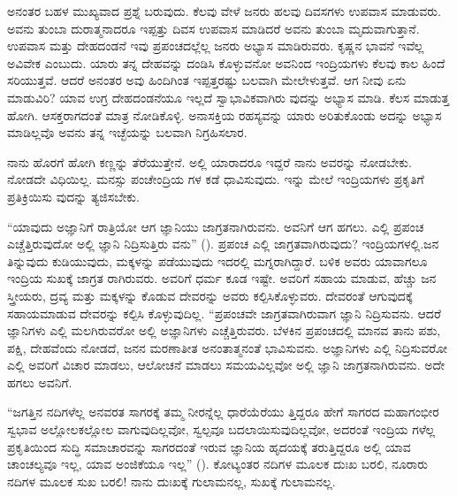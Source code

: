 ಅನಂತರ ಬಹಳ ಮುಖ್ಯವಾದ ಪ್ರಶ್ನೆ ಬರುವುದು. ಕೆಲವು ವೇಳೆ ಜನರು ಹಲವು ದಿವಸಗಳು ಉಪವಾಸ ಮಾಡುವರು. ಅವನು ತುಂಬಾ ದುರಾತ್ಮನಾದರೂ ಇಪ್ಪತ್ತು ದಿವಸ ಉಪವಾಸ ಮಾಡಿದರೆ ಅವನು ತುಂಬಾ ಮೃದುವಾಗುತ್ತಾನೆ. ಉಪವಾಸ ಮತ್ತು ದೇಹದಂಡನೆ ಇವು ಪ್ರಪಂಚದಲ್ಲೆಲ್ಲ ಜನರು ಅಭ್ಯಾಸ ಮಾಡಿರುವರು. ಕೃಷ್ಣನ ಭಾವನೆ ಇವೆಲ್ಲ ಅವಿವೇಕ ಎಂಬುದು. ಯಾರು ತನ್ನ ದೇಹವನ್ನು ದಂಡಿಸಿ ಕೊಳ್ಳುವನೋ ಅವನಿಂದ ಇಂದ್ರಿಯಗಳು ಕೆಲವು ಕಾಲ ಹಿಂದೆ ಸರಿಯುತ್ತವೆ. ಆದರೆ ಅನಂತರ ಅವು ಹಿಂದಿಗಿಂತ ಇಪ್ಪತ್ತರಷ್ಟು ಬಲವಾಗಿ ಮೇಲೇಳುತ್ತವೆ. ಆಗ ನೀವು ಏನು ಮಾಡುವಿರಿ? ಯಾವ ಉಗ್ರ ದೇಹದಂಡನೆಯೂ ಇಲ್ಲದೆ ಸ್ವಾಭಾವಿಕವಾಗಿರು ವುದನ್ನು ಅಭ್ಯಾಸ ಮಾಡಿ. ಕೆಲಸ ಮಾಡುತ್ತ ಹೋಗಿ. ಆಸಕ್ತರಾಗದಂತೆ ಮಾತ್ರ ನೋಡಿಕೊಳ್ಳಿ. ಅನಾಸಕ್ತಿಯ ರಹಸ್ಯವನ್ನು ಯಾರು ಅರಿತುಕೊಂಡು ಅದನ್ನು ಅಭ್ಯಾಸ ಮಾಡಿಲ್ಲವೊ ಅವನು ತನ್ನ ಇಚ್ಛೆಯನ್ನು ಬಲವಾಗಿ ನಿಗ್ರಹಿಸಲಾರ.

ನಾನು ಹೊರಗೆ ಹೋಗಿ ಕಣ್ಣನ್ನು ತೆರೆಯುತ್ತೇನೆ. ಅಲ್ಲಿ ಯಾರಾದರೂ ಇದ್ದರೆ ನಾನು ಅವರನ್ನು ನೋಡಬೇಕು. ನೋಡದೇ ವಿಧಿಯಿಲ್ಲ. ಮನಸ್ಸು ಪಂಚೇಂದ್ರಿಯ ಗಳ ಕಡೆ ಧಾವಿಸುವುದು. ಇನ್ನು ಮೇಲೆ ಇಂದ್ರಿಯಗಳು ಪ್ರಕೃತಿಗೆ ಪ್ರತಿಕ್ರಿಯಿಸು ವುದನ್ನು ತ್ಯಜಿಸಬೇಕು.

“ಯಾವುದು ಅಜ್ಞಾನಿಗೆ ರಾತ್ರಿಯೋ ಆಗ ಜ್ಞಾನಿಯು ಜಾಗ್ರತನಾಗಿರುವನು. ಅವನಿಗೆ ಆಗ ಹಗಲು. ಎಲ್ಲಿ ಪ್ರಪಂಚ ಎಚ್ಚೆತ್ತಿರುವುದೋ ಅಲ್ಲಿ ಜ್ಞಾನಿ ನಿದ್ರಿಸುತ್ತಿರು ವನು” (). ಪ್ರಪಂಚ ಎಲ್ಲಿ ಜಾಗ್ರತವಾಗಿರುವುದು? ಇಂದ್ರಿಯಗಳಲ್ಲಿ.ಜನ ತಿನ್ನುವುದು ಕುಡಿಯುವುದು, ಮಕ್ಕಳನ್ನು ಪಡೆಯುವುದು ಇದರಲ್ಲಿ ಮಗ್ನರಾಗಿದ್ದಾರೆ. ಬಳಿಕ ಅವರು ಯಾವಾಗಲೂ ಇಂದ್ರಿಯ ಸುಖಕ್ಕೆ ಜಾಗ್ರತ ರಾಗಿರುವರು. ಅವರಿಗೆ ಧರ್ಮ ಕೂಡ ಇಷ್ಟೇ. ಅವರಿಗೆ ಸಹಾಯ ಮಾಡುವ, ಹೆಚ್ಚು ಜನ ಸ್ತ್ರೀಯರು, ದ್ರವ್ಯ ಮತ್ತು ಮಕ್ಕಳನ್ನು ಕೊಡುವ ದೇವರನ್ನು ಅವರು ಕಲ್ಪಿಸಿಕೊಳ್ಳುವರು. ದೇವರಂತೆ ಆಗುವುದಕ್ಕೆ ಸಹಾಯಮಾಡುವ ದೇವರನ್ನು ಕಲ್ಪಿಸಿ ಕೊಳ್ಳುವುದಿಲ್ಲ. “ಪ್ರಪಂಚವೇ ಜಾಗ್ರತವಾಗಿರುವಾಗ ಜ್ಞಾನಿ ನಿದ್ರಿಸುವನು. ಆದರೆ ಜ್ಞಾನಿಗಳು ಎಲ್ಲಿ ಮಲಗಿರುವರೋ ಅಲ್ಲಿ ಅಜ್ಞಾನಿಗಳು ಎಚ್ಚೆತ್ತಿರುವರು. ಬೆಳಕಿನ ಪ್ರಪಂಚದಲ್ಲಿ ಮಾನವ ತಾನು ಪಶು, ಪಕ್ಷಿ, ದೇಹವೆಂದು ನೋಡದೆ, ಜನನ ಮರಣಾತೀತ ಅನಂತಾತ್ಮನಂತೆ ಭಾವಿಸುವನು. ಅಜ್ಞಾನಿಗಳು ಎಲ್ಲಿ ನಿದ್ರಿಸುವರೋ ಎಲ್ಲಿ ಅವರಿಗೆ ವಿಚಾರ ಮಾಡಲು, ಆಲೋಚನೆ ಮಾಡಲು ಸಮಯವಿಲ್ಲವೋ ಅಲ್ಲಿ ಜ್ಞಾನಿ ಜಾಗ್ರತನಾಗಿರುವನು. ಅದೇ ಹಗಲು ಅವನಿಗೆ.

“ಜಗತ್ತಿನ ನದಿಗಳೆಲ್ಲ ಅನವರತ ಸಾಗರಕ್ಕೆ ತಮ್ಮ ನೀರನ್ನೆಲ್ಲ ಧಾರೆಯೆರೆಯು ತ್ತಿದ್ದರೂ ಹೇಗೆ ಸಾಗರದ ಮಹಾಗಂಭೀರ ಸ್ವಭಾವ ಅಲ್ಲೋಲಕಲ್ಲೋಲ ವಾಗುವುದಿಲ್ಲವೋ, ಸ್ವಲ್ಪವೂ ಬದಲಾಯಿಸುವುದಿಲ್ಲವೋ, ಅದರಂತೆ ಇಂದ್ರಿಯ ಗಳೆಲ್ಲ ಪ್ರಕೃತಿಯಿಂದ ಸುದ್ಧಿ ಸಮಾಚಾರವನ್ನು ಸಾಗರದಂತೆ ಇರುವ ಜ್ಞಾನಿಯ ಹೃದಯಕ್ಕೆ ತರುತ್ತಿದ್ದರೂ ಅಲ್ಲಿ ಯಾವ ಚಾಂಚಲ್ಯವೂ ಇಲ್ಲ, ಯಾವ ಅಂಜಿಕೆಯೂ ಇಲ್ಲ” (). ಕೋಟ್ಯಂತರ ನದಿಗಳ ಮೂಲಕ ದುಃಖ ಬರಲಿ, ನೂರಾರು ನದಿಗಳ ಮೂಲಕ ಸುಖ ಬರಲಿ! ನಾನು ದುಃಖಕ್ಕೆ ಗುಲಾಮನಲ್ಲ, ಸುಖಕ್ಕೆ ಗುಲಾಮನಲ್ಲ.

